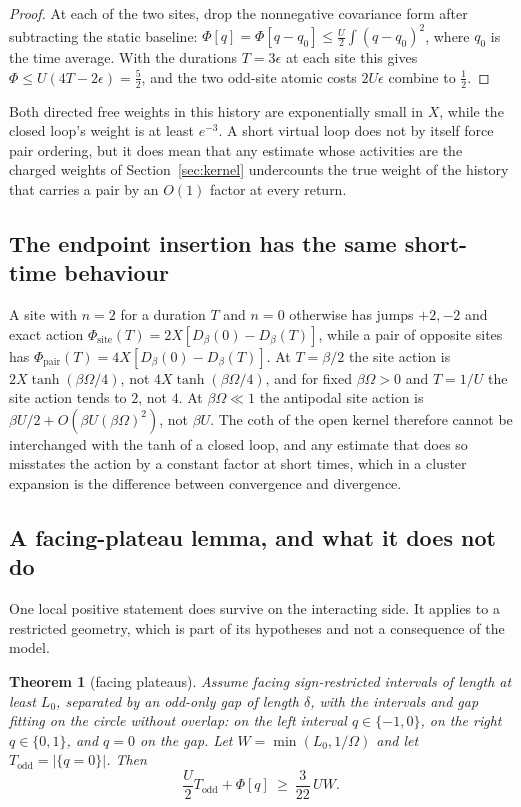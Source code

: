 \documentclass[11pt]{article}
\newtheorem{theorem}{Theorem}[section]
\theoremstyle{definition}
\theoremstyle{remark}
\begin{document}
\begin{proof}
At each of the two sites, drop the nonnegative covariance form after subtracting
the static baseline: $\Phi[q]=\Phi[q-q_{0}]\le\tfrac U2\int(q-q_{0})^{2}$, where
$q_{0}$ is the time average. With the durations $T=3\epsilon$ at each site this
gives $\Phi\le U(4T-2\epsilon)=\tfrac52$, and the two odd-site atomic costs
$2U\epsilon$ combine to $\tfrac12$.
\end{proof}

Both directed free weights in this history are exponentially small in $X$, while
the closed loop's weight is at least $e^{-3}$. A short virtual loop does not by
itself force pair ordering, but it does mean that any estimate whose activities
are the charged weights of Section~\ref{sec:kernel} undercounts the true weight of
the history that carries a pair by an $O(1)$ factor at every return.

\subsection{The endpoint insertion has the same short-time behaviour}

A site with $n=2$ for a duration $T$ and $n=0$ otherwise has jumps $+2,-2$ and
exact action $\Phi_{\mathrm{site}}(T)=2X[D_{\beta}(0)-D_{\beta}(T)]$, while a
pair of opposite sites has $\Phi_{\mathrm{pair}}(T)=4X[D_{\beta}(0)-D_{\beta}(T)]$.
At $T=\beta/2$ the site action is $2X\tanh(\beta\Omega/4)$, not $4X\tanh(\beta\Omega/4)$,
and for fixed $\beta\Omega>0$ and $T=1/U$ the site action tends to $2$, not $4$.
At $\beta\Omega\ll1$ the antipodal site action is $\beta U/2+O(\beta U(\beta\Omega)^{2})$,
not $\beta U$. The coth of the open kernel therefore cannot be interchanged with
the tanh of a closed loop, and any estimate that does so misstates the action by a
constant factor at short times, which in a cluster expansion is the difference
between convergence and divergence.

\subsection{A facing-plateau lemma, and what it does not do}

One local positive statement does survive on the interacting side. It applies to
a restricted geometry, which is part of its hypotheses and not a consequence of
the model.

\begin{theorem}[facing plateaus]
\label{thm:plateau}
Assume facing sign-restricted intervals of length at least $L_{0}$, separated by
an odd-only gap of length $\delta$, with the intervals and gap fitting on the
circle without overlap: on the left interval $q\in\{-1,0\}$, on the right
$q\in\{0,1\}$, and $q=0$ on the gap. Let $W=\min(L_{0},1/\Omega)$ and let
$T_{\mathrm{odd}}=|\{q=0\}|$. Then
\begin{equation}
\frac U2T_{\mathrm{odd}}+\Phi[q]\ \ge\ \frac{3}{22}\,UW .
\label{eq:plateau}
\end{equation}
\end{theorem}
\end{document}
